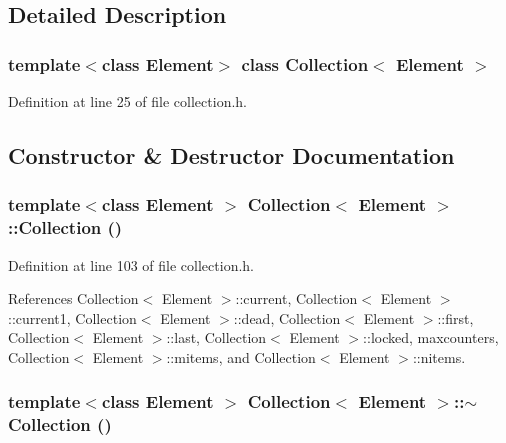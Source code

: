 \subsection{Detailed Description}
\subsubsection*{template$<$class Element$>$ class Collection$<$ Element $>$}



Definition at line 25 of file collection.h.

\subsection{Constructor \& Destructor Documentation}
\hypertarget{classCollection_12a4fc0e5c8ce642ed3ea13f0fcfaccf}{
\subsubsection[{Collection}]{\setlength{\rightskip}{0pt plus 5cm}template$<$class Element $>$ {\bf Collection}$<$ Element $>$::{\bf Collection} ()}}
\label{classCollection_12a4fc0e5c8ce642ed3ea13f0fcfaccf}




Definition at line 103 of file collection.h.

References Collection$<$ Element $>$::current, Collection$<$ Element $>$::current1, Collection$<$ Element $>$::dead, Collection$<$ Element $>$::first, Collection$<$ Element $>$::last, Collection$<$ Element $>$::locked, maxcounters, Collection$<$ Element $>$::mitems, and Collection$<$ Element $>$::nitems.\hypertarget{classCollection_50af9ee71acaf70b0754bbab0f3d9a9a}{
\subsubsection[{$\sim$Collection}]{\setlength{\rightskip}{0pt plus 5cm}template$<$class Element $>$ {\bf Collection}$<$ Element $>$::$\sim${\bf Collection} ()}}
\label{classCollection_50af9ee71acaf70b0754bbab0f3d9a9a}




